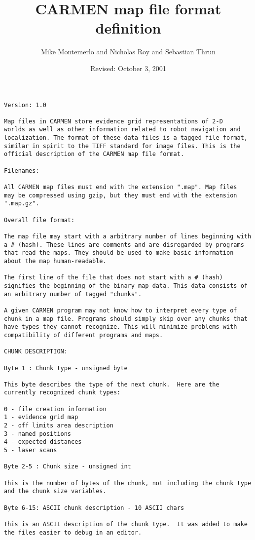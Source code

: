 \documentclass{article}
\title{CARMEN map file format definition}
\author{Mike Montemerlo and Nicholas Roy and Sebastian Thrun}
\date{Revised: October 3, 2001}
\begin{document}
\maketitle

\begin{verbatim}
Version: 1.0

Map files in CARMEN store evidence grid representations of 2-D
worlds as well as other information related to robot navigation and
localization. The format of these data files is a tagged file format,
similar in spirit to the TIFF standard for image files. This is the
official description of the CARMEN map file format.

Filenames:

All CARMEN map files must end with the extension ".map". Map files
may be compressed using gzip, but they must end with the extension
".map.gz".

Overall file format:

The map file may start with a arbitrary number of lines beginning with
a # (hash). These lines are comments and are disregarded by programs
that read the maps. They should be used to make basic information
about the map human-readable.

The first line of the file that does not start with a # (hash)
signifies the beginning of the binary map data. This data consists of
an arbitrary number of tagged "chunks".

A given CARMEN program may not know how to interpret every type of
chunk in a map file. Programs should simply skip over any chunks that
have types they cannot recognize. This will minimize problems with
compatibility of different programs and maps.

CHUNK DESCRIPTION:

Byte 1 : Chunk type - unsigned byte

This byte describes the type of the next chunk.  Here are the
currently recognized chunk types:

0 - file creation information
1 - evidence grid map
2 - off limits area description
3 - named positions
4 - expected distances
5 - laser scans

Byte 2-5 : Chunk size - unsigned int

This is the number of bytes of the chunk, not including the chunk type
and the chunk size variables.

Byte 6-15: ASCII chunk description - 10 ASCII chars

This is an ASCII description of the chunk type.  It was added to make
the files easier to debug in an editor.


\end{verbatim}
\end{document}
